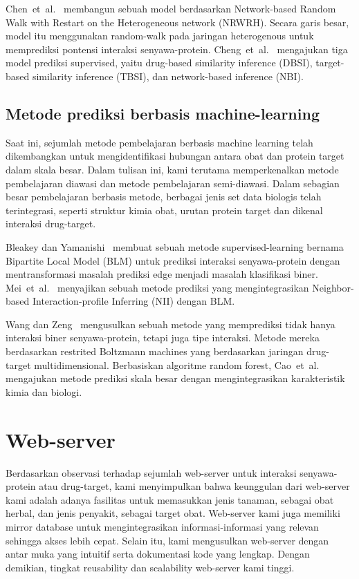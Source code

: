 Chen~et~al.~\cite{chen} membangun sebuah model berdasarkan Network-based Random Walk with Restart on the Heterogeneous network (NRWRH).
Secara garis besar, model itu menggunakan random-walk pada jaringan heterogenous untuk memprediksi pontensi interaksi senyawa-protein.
Cheng~et~al.~\cite{cheng} mengajukan tiga model prediksi supervised, yaitu 
drug-based similarity inference (DBSI), target-based similarity inference (TBSI), dan network-based inference (NBI).


\subsection{Metode prediksi berbasis machine-learning}
Saat ini, sejumlah metode pembelajaran berbasis machine learning telah dikembangkan untuk mengidentifikasi hubungan antara obat dan protein target dalam skala besar. 
Dalam tulisan ini, kami terutama memperkenalkan metode pembelajaran diawasi dan metode pembelajaran semi-diawasi. 
Dalam sebagian besar pembelajaran berbasis metode, berbagai jenis set data biologis telah terintegrasi, seperti struktur kimia obat, urutan protein target dan dikenal interaksi drug-target.

Bleakey dan Yamanishi~\cite{bleakley_yamanishi} membuat sebuah metode supervised-learning bernama Bipartite Local Model (BLM)
untuk prediksi interaksi senyawa-protein dengan mentransformasi masalah prediksi edge menjadi masalah klasifikasi biner.
Mei~et~al.~\cite{mei} menyajikan sebuah metode prediksi yang mengintegrasikan Neighbor-based Interaction-profile Inferring (NII) dengan BLM.

Wang dan Zeng~\cite{wang} mengusulkan sebuah metode yang memprediksi tidak hanya interaksi biner senyawa-protein, tetapi juga tipe interaksi.
Metode mereka berdasarkan restrited Boltzmann machines yang berdasarkan jaringan drug-target multidimensional.
Berbasiskan algoritme random forest, Cao~et~al.~\cite{cao} mengajukan metode prediksi skala besar dengan mengintegrasikan karakteristik kimia dan biologi.

\section{Web-server}
Berdasarkan observasi terhadap sejumlah web-server untuk interaksi senyawa-protein atau drug-target, kami menyimpulkan bahwa keunggulan dari web-server kami adalah adanya fasilitas untuk memasukkan jenis tanaman, sebagai obat herbal, dan jenis penyakit, sebagai target obat.
Web-server kami juga memiliki mirror database untuk mengintegrasikan informasi-informasi yang relevan sehingga akses lebih cepat.
Selain itu, kami mengusulkan web-server dengan antar muka yang intuitif serta dokumentasi kode yang lengkap.
Dengan demikian, tingkat reusability dan scalability web-server kami tinggi.

